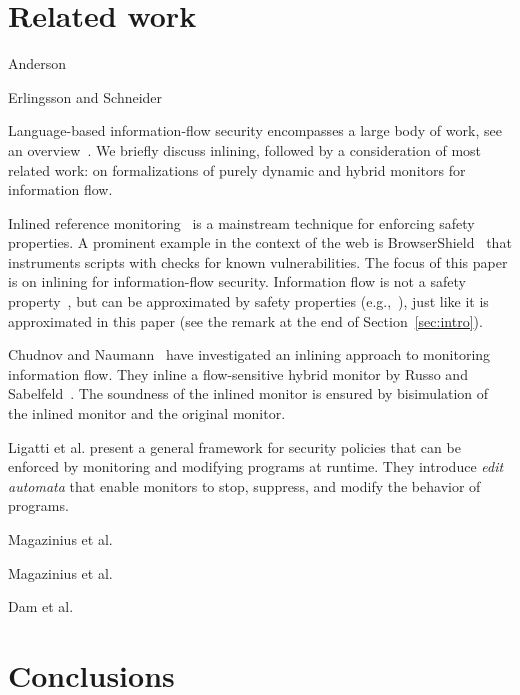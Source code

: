 \documentclass{llncs}
\begin{document}
\section{Related work}
\label{sec:related}

Anderson~\cite{Anderson:72}

Erlingsson and Schneider~\cite{DBLP:conf/nspw/ErlingssonS99}

Language-based information-flow security encompasses a large body of
work, see an overview~\cite{Sabelfeld:Myers:JSAC}. We briefly
discuss inlining, followed by a consideration of most related work: on
formalizations of purely dynamic and hybrid monitors for information flow.

Inlined reference monitoring~\cite{Erlingsson:PhD04} is a mainstream
technique for enforcing safety properties. 
A prominent example in the context of the web is
BrowserShield~\cite{Reis+:TWeb07} that instruments scripts with
checks for known vulnerabilities.
The focus of this paper is on inlining for information-flow security. Information flow is not
a safety property~\cite{McLean:SSP94}, but can be approximated by
safety properties
(e.g.,~\cite{Boudol:FAST08,Sabelfeld:Russo:PSI09,Austin:Flanagan:PLAS09}),
just like it is approximated in this paper (see the remark at the end of Section~\ref{sec:intro}).

Chudnov and
Naumann~\cite{Chudnov:Naumann:CSF10} have investigated an inlining
approach to monitoring information flow. They inline a flow-sensitive
hybrid monitor by Russo and
Sabelfeld~\cite{Russo:Sabelfeld:CSF10}. The soundness of the inlined
monitor is ensured by bisimulation of the inlined monitor and the
original monitor.

Ligatti et al. \cite{Ligatti05editautomata:} present a 
general framework for security policies that can
be enforced by monitoring and modifying programs at runtime. 
They introduce \emph{edit automata} that enable
monitors to stop, suppress, and modify the behavior of programs. 

Magazinius et al.~\cite{DBLP:conf/nordsec/MagaziniusPS10}

Magazinius et al.~\cite{DBLP:journals/compsec/MagaziniusRS12}

Dam et al.~\cite{DBLP:conf/ecoop/DamJLP09,DBLP:journals/jcs/DamJLP10,DBLP:conf/ccs/DamGL12}

\section{Conclusions}
\label{sec:conc}



\end{document}
